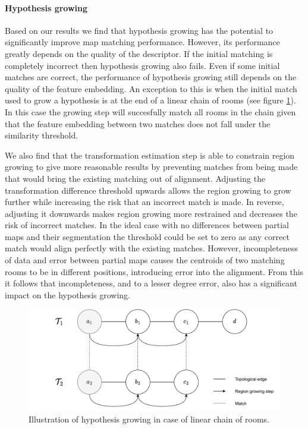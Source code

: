 \paragraph{Hypothesis growing}
Based on our results we find that hypothesis growing has the potential to significantly improve map matching performance. However, its performance greatly depends on the quality of the descriptor. If the initial matching is completely incorrect then hypothesis growing also fails. Even if some initial matches are correct, the performance of hypothesis growing still depends on the quality of the feature embedding. An exception to this is when the initial match used to grow a hypothesis is at the end of a linear chain of rooms (see figure \ref{fig:hypothesis_growing_chain}). In this case the growing step will succesfully match all rooms in the chain given that the feature embedding between two matches does not fall under the similarity threshold. 

We also find that the transformation estimation step is able to constrain region growing to give more reasonable results by preventing matches from being made that would bring the existing matching out of alignment. Adjusting the transformation difference threshold upwards allows the region growing to grow further while increasing the risk that an incorrect match is made. In reverse, adjusting it downwards makes region growing more restrained and decreases the risk of incorrect matches. In the ideal case with no differences between partial maps and their segmentation the threshold could be set to zero as any correct match would align perfectly with the existing matches. However, incompleteness of data and error between partial maps causes the centroids of two matching rooms to be in different positions, introducing error into the alignment. From this it follows that incompleteness, and to a lesser degree error, also has a significant impact on the hypothesis growing.

\pagebreak

\begin{figure}[h]
    \centering
    \includegraphics*[width=\textwidth]{./fig/hypothesis_Growing_ideal_chain.drawio.pdf}
    \caption{Illustration of hypothesis growing in case of linear chain of rooms.}
    \label{fig:hypothesis_growing_chain}

\end{figure}



